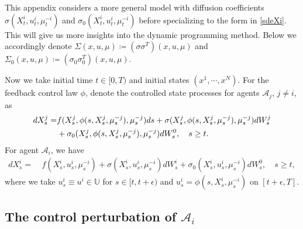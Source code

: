\documentclass{amsart}
\theoremstyle{definition}
\theoremstyle{remark}
\def\cal{\mathcal}
\numberwithin{equation}{section}
\begin{document}
\label{sec:AppA}

\renewcommand{\theequation}{A.\arabic{equation}}
\setcounter{equation}{0}
\renewcommand{\thetheorem}{A.\arabic{theorem}}
\setcounter{theorem}{0}
\renewcommand{\thesection}{A.\arabic{theorem}}
\setcounter{theorem}{0}
\renewcommand{\thesubsection}{A.\arabic{subsection}}
\setcounter{subsection}{0}





This appendix considers a more general model with diffusion coefficients $\sigma (X_t^i, u_t^i, \mu_t^{-i})$ and
 $\sigma_0(X_t^i, u_t^i, \mu_t^{-i})$ before specializing to the form in \eqref{sdeXi}. This will give us more insights into the dynamic programming method.        Below we accordingly denote $\Sigma(x,u,\mu)\coloneqq (\sigma\sigma^T)(x,u,\mu)$
and
$\Sigma_0(x,u,\mu) \coloneqq (\sigma_0\sigma_0^T)(x,u,\mu)$.


Now we take  initial time $t\in [0,T)$ and initial states $(x^1, \cdots, x^N)$. For the feedback control law $\phi$,   denote the controlled state processes
for agents ${\cal A}_j$, $j\ne i$, as
\begin{align}
dX_s^j=& f(X_s^j,
 \phi(s, X_s^j,  \mu_s^{-j}), \mu_s^{-j}) ds
  +\sigma(X_s^j, \phi(s, X_s^j,  \mu_s^{-j}), \mu^{-j}_s) dW_s^j
  \label{dxjapp} \\
  &+\sigma_0(X_s^j,\phi(s, X_s^j,  \mu_s^{-j}), \mu_{s}^{-j}) dW_s^0,\quad s\ge t. \notag
\end{align}
For agent ${\cal A}_i$, we have
\begin{align} \label{dxiapp}
dX_s^i =\ &f(X_s^i, u_s^i, \mu_s^{-i}) +\sigma(X_s^i, u_s^i, \mu^{-i}_{s}) dW_s^i
 +\sigma_0(X_s^i, u_s^i, \mu_{s}^{-i}) dW_s^0,\quad s\ge t,
\end{align}
where we take $u_s^i\equiv u^i\in \mathbb{U}$ for $s\in [t,t+\epsilon)$ and $u_s^i=\phi(s, X_s^i, \mu_s^{-i})$ on $[t+\epsilon, T]$.





\subsection{The control perturbation of ${\cal A}_i$}
\label{sec:pbp}
\end{document}
